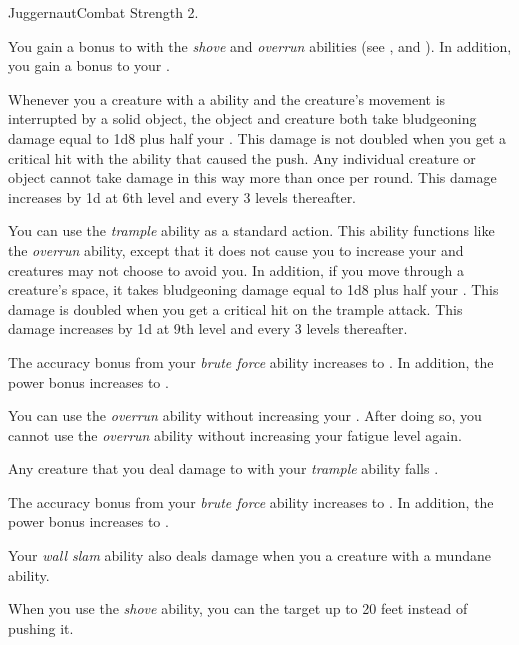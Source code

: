     \begin{feat}{Juggernaut}{Combat}
        \featpre Strength 2.

         You gain a  bonus to  with the \textit{shove} and \textit{overrun} abilities (see , and ).
        In addition, you gain a  bonus to your .

         Whenever you  a creature with a  ability and the creature's movement is interrupted by a solid object, the object and creature both take bludgeoning damage equal to 1d8 plus half your .
        This damage is not doubled when you get a critical hit with the ability that caused the push.
        Any individual creature or object cannot take damage in this way more than once per round.
        This damage increases by \plus1d at 6th level and every 3 levels thereafter.

         You can use the \textit{trample} ability as a standard action.
        This ability functions like the \textit{overrun} ability, except that it does not cause you to increase your  and creatures may not choose to avoid you.
        In addition, if you move through a creature's space, it takes bludgeoning damage equal to 1d8 plus half your .
        This damage is doubled when you get a critical hit on the trample attack.
        This damage increases by \plus1d at 9th level and every 3 levels thereafter.

         The accuracy bonus from your \textit{brute force} ability increases to .
        In addition, the power bonus increases to .

         You can use the \textit{overrun} ability without increasing your .
        After doing so, you  cannot use the \textit{overrun} ability without increasing your fatigue level again.

         Any creature that you deal damage to with your \textit{trample} ability falls \prone.

         The accuracy bonus from your \textit{brute force} ability increases to .
        In addition, the power bonus increases to .

         Your \textit{wall slam} ability also deals damage when you  a creature with a mundane ability.

         When you use the \textit{shove} ability, you can  the target up to 20 feet instead of pushing it.
    \end{feat}

